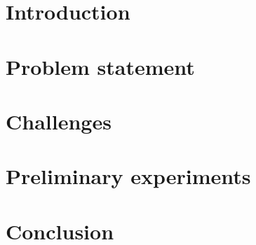 \documentclass[sigconf]{acmart}
\theoremstyle{remark}
\begin{document}



    \maketitle

    \thispagestyle{empty}


    \section{Introduction}
%


    \section{Problem statement}
%


    \section{Challenges}
%

    \section {Preliminary experiments}
%


    \section{Conclusion}
%

    
    
\end{document}
